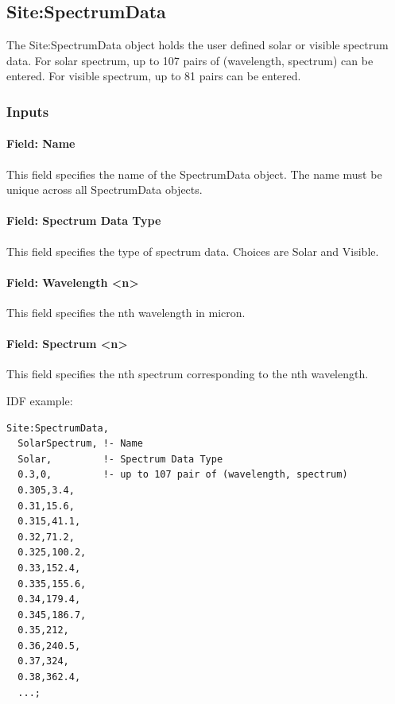 \subsection{Site:SpectrumData}\label{sitespectrumdata}

The Site:SpectrumData object holds the user defined solar or visible spectrum data. For solar spectrum, up to 107 pairs of (wavelength, spectrum) can be entered. For visible spectrum, up to 81 pairs can be entered.

\subsubsection{Inputs}\label{inputs-25-001}

\paragraph{Field: Name}\label{field-name-11-007}

This field specifies the name of the SpectrumData object. The name must be unique across all SpectrumData objects.

\paragraph{Field: Spectrum Data Type}\label{field-spectrum-data-type}

This field specifies the type of spectrum data. Choices are Solar and Visible.

\paragraph{Field: Wavelength \textless{}n\textgreater{}}\label{field-wavelength-n}

This field specifies the nth wavelength in micron.

\paragraph{Field: Spectrum \textless{}n\textgreater{}}\label{field-spectrum-n}

This field specifies the nth spectrum corresponding to the nth wavelength.

IDF example:

\begin{lstlisting}
Site:SpectrumData,
  SolarSpectrum, !- Name
  Solar,         !- Spectrum Data Type
  0.3,0,         !- up to 107 pair of (wavelength, spectrum)
  0.305,3.4,
  0.31,15.6,
  0.315,41.1,
  0.32,71.2,
  0.325,100.2,
  0.33,152.4,
  0.335,155.6,
  0.34,179.4,
  0.345,186.7,
  0.35,212,
  0.36,240.5,
  0.37,324,
  0.38,362.4,
  ...;
\end{lstlisting}

